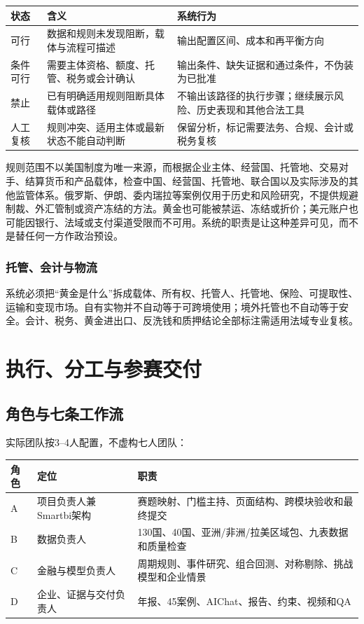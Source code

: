 \documentclass[UTF8,fontset=windows,12pt,openany]{ctexbook}
\begin{document}
\begin{longtable}{p{2.8cm}p{5.2cm}p{5.5cm}}
\toprule
\textbf{状态} & \textbf{含义} & \textbf{系统行为}\\
\midrule
可行 & 数据和规则未发现阻断，载体与流程可描述 & 输出配置区间、成本和再平衡方向\\
条件可行 & 需要主体资格、额度、托管、税务或会计确认 & 输出条件、缺失证据和通过条件，不伪装为已批准\\
禁止 & 已有明确适用规则阻断具体载体或路径 & 不输出该路径的执行步骤；继续展示风险、历史表现和其他合法工具\\
人工复核 & 规则冲突、适用主体或最新状态不能自动判断 & 保留分析，标记需要法务、合规、会计或税务复核\\
\bottomrule
\end{longtable}

规则范围不以美国制度为唯一来源，而根据企业主体、经营国、托管地、交易对手、结算货币和产品载体，检查中国、经营国、托管地、联合国以及实际涉及的其他监管体系。俄罗斯、伊朗、委内瑞拉等案例仅用于历史和风险研究，不提供规避制裁、外汇管制或资产冻结的方法。黄金也可能被禁运、冻结或折价\cite{ofac1029,imfgold2023}；美元账户也可能因银行、法域或支付渠道受限而不可用。系统的职责是让这种差异可见，而不是替任何一方作政治预设。

\section{托管、会计与物流}

系统必须把“黄金是什么”拆成载体、所有权、托管人、托管地、保险、可提取性、运输和变现市场。自有实物并不自动等于可跨境使用；境外托管也不自动等于安全。会计、税务、黄金进出口、反洗钱和质押结论全部标注需适用法域专业复核。

\part{执行、分工与参赛交付}

\chapter{角色与七条工作流}

实际团队按3--4人配置，不虚构七人团队：

\begin{longtable}{p{1.0cm}p{4.0cm}p{8.4cm}}
\toprule
\textbf{角色} & \textbf{定位} & \textbf{职责}\\
\midrule
A & 项目负责人兼Smartbi架构 & 赛题映射、门槛主持、页面结构、跨模块验收和最终提交\\
B & 数据负责人 & 130国、40国、亚洲/非洲/拉美区域包、九表数据和质量检查\\
C & 金融与模型负责人 & 周期规则、事件研究、组合回测、对称剔除、挑战模型和企业情景\\
D & 企业、证据与交付负责人 & 年报、45案例、AIChat、报告、约束、视频和QA\\
\bottomrule
\end{longtable}
\end{document}
